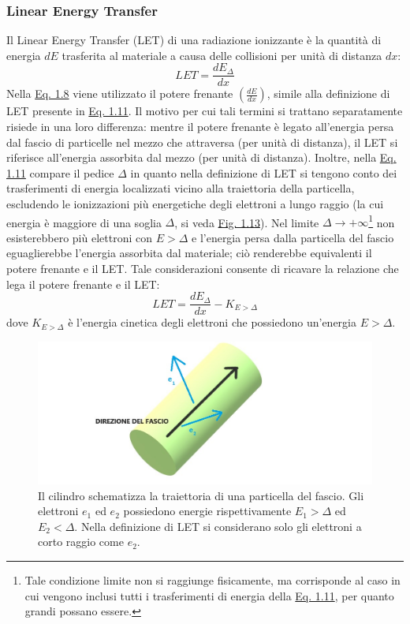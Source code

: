 \documentclass[12pt,a4paper,twoside]{report}
\begin{document}
	\subsubsection{Linear Energy Transfer}\label{par:let}
	Il Linear Energy Transfer (LET) di una radiazione ionizzante è la quantità di energia $dE$ trasferita al materiale a causa delle collisioni per unità di distanza $dx$:
	\begin{equation}
		LET=\frac{dE_\Delta}{dx}
		\label{eq:let}
	\end{equation}
	Nella \hyperref[eq:dose_as]{Eq. 1.8} viene utilizzato il potere frenante $\left(\frac{dE}{dx}\right)$, simile alla definizione di LET presente in \hyperref[eq:let]{Eq. 1.11}. Il motivo per cui tali termini si trattano separatamente risiede in una loro differenza: mentre il potere frenante è legato all'energia persa dal fascio di particelle nel mezzo che attraversa (per unità di distanza), il LET si riferisce all'energia assorbita dal mezzo (per unità di distanza). Inoltre, nella \hyperref[eq:let]{Eq. 1.11} compare il pedice $\Delta$ in quanto nella definizione di LET si tengono conto dei trasferimenti di energia localizzati vicino alla traiettoria della particella, escludendo le ionizzazioni più energetiche degli elettroni a lungo raggio (la cui energia è maggiore di una soglia $\Delta$, si veda \hyperref[fig:let]{Fig. 1.13}). Nel limite $\Delta\rightarrow+\infty$\footnote{Tale condizione limite non si raggiunge fisicamente, ma corrisponde al caso in cui vengono inclusi tutti i trasferimenti di energia della \hyperref[eq:let]{Eq. 1.11}, per quanto grandi possano essere.} non esisterebbero più elettroni con $E>\Delta$ e l'energia persa dalla particella del fascio eguaglierebbe l'energia assorbita dal materiale; ciò renderebbe equivalenti il potere frenante e il LET. Tale considerazioni consente di ricavare la relazione che lega il potere frenante e il LET:
	\begin{equation}
		LET=\frac{dE_\Delta}{dx}-K_{E>\Delta}
		\label{eq:let&stoppingpower}
	\end{equation}
	dove $K_{E>\Delta}$ è l'energia cinetica degli elettroni che possiedono un'energia $E>\Delta$.
	\begin{figure}[H]
		\centering
		\includegraphics[width=0.9\linewidth]{let.jpg}
		\caption{Il cilindro schematizza la traiettoria di una particella del fascio. Gli elettroni $e_1$ ed $e_2$ possiedono energie rispettivamente $E_1>\Delta$ ed $E_2<\Delta$. Nella definizione di LET si considerano solo gli elettroni a corto raggio come $e_2$.}
		\label{fig:let}
	\end{figure}
\end{document}
